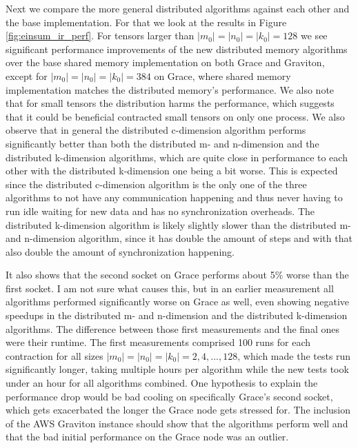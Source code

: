 Next we compare the more general distributed algorithms against each other and the base implementation.
For that we look at the results in Figure \ref{fig:einsum_ir_perf}.
For tensors larger than $|m_0|=|n_0|=|k_0|=128$ we see significant performance improvements of the new distributed memory algorithms over the base shared memory implementation on both Grace and Graviton, except for $|m_0|=|n_0|=|k_0|=384$ on Grace, where shared memory implementation matches the distributed memory's performance.
We also note that for small tensors the distribution harms the performance, which suggests that it could be beneficial contracted small tensors on only one process.
We also observe that in general the distributed c-dimension algorithm performs significantly better than both the distributed m- and n-dimension and the distributed k-dimension algorithms, which are quite close in performance to each other with the distributed k-dimension one being a bit worse.
This is expected since the distributed c-dimension algorithm is the only one of the three algorithms to not have any communication happening and thus never having to run idle waiting for new data and has no synchronization overheads.
The distributed k-dimension algorithm is likely slightly slower than the distributed m- and n-dimension algorithm, since it has double the amount of steps and with that also double the amount of synchronization happening.

It also shows that the second socket on Grace performs about 5\% worse than the first socket.
I am not sure what causes this, but in an earlier measurement all algorithms performed significantly worse on Grace as well, even showing negative speedups in the distributed m- and n-dimension and the distributed k-dimension algorithms.
The difference between those first measurements and the final ones were their runtime.
The first measurements comprised 100 runs for each contraction for all sizes $|m_0|=|n_0|=|k_0|=2,4,...,128$, which made the tests run significantly longer, taking multiple hours per algorithm while the new tests took under an hour for all algorithms combined.
One hypothesis to explain the performance drop would be bad cooling on specifically Grace's second socket, which gets exacerbated the longer the Grace node gets stressed for.
The inclusion of the AWS Graviton instance should show that the algorithms perform well and that the bad initial performance on the Grace node was an outlier.


